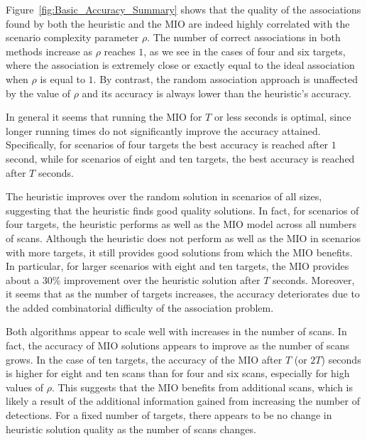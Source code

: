 Figure~\ref{fig:Basic_Accuracy_Summary} shows that the quality of the associations found by both the heuristic and the MIO are indeed highly correlated with the scenario complexity parameter $\rho$. The number of correct associations in both methods increase as $\rho$ reaches $1$, as we see in the cases of four and six targets, where the association is extremely close or exactly equal to the ideal association when $\rho$ is equal to $1$. By contrast, the random association approach is unaffected by the value of $\rho$ and its accuracy is always lower than the heuristic's accuracy. 

In general it seems that running the MIO for $T$ or less seconds is optimal, since longer running times do not significantly improve the accuracy attained. Specifically, for scenarios of four targets the best accuracy is reached after $1$ second, while for scenarios of eight and ten targets, the best accuracy is reached after $T$ seconds. 

The heuristic improves over the random solution in scenarios of all sizes, suggesting that the heuristic finds good quality solutions. In fact, for scenarios of four targets, the heuristic performs as well as the MIO model across all numbers of scans. Although the heuristic does not perform as well as the MIO in scenarios with more targets, it still provides good solutions from which the MIO benefits. In particular, for larger scenarios with eight and ten targets, the MIO provides about a $30\%$ improvement over the heuristic solution after $T$ seconds. Moreover, it seems that as the number of targets increases, the accuracy deteriorates due to the added combinatorial difficulty of the association problem. 

Both algorithms appear to scale well with increases in the number of scans. In fact, the accuracy of MIO solutions appears to improve as the number of scans grows. In the case of ten targets, the accuracy of the MIO after $T$ (or $2T$) seconds is higher for eight and ten scans than for four and six scans, especially for high values of $\rho$. This suggests that the MIO benefits from additional scans, which is likely a result of the additional information gained from increasing the number of detections. For a fixed number of targets, there appears to be no change in heuristic solution quality as the number of scans changes. 

